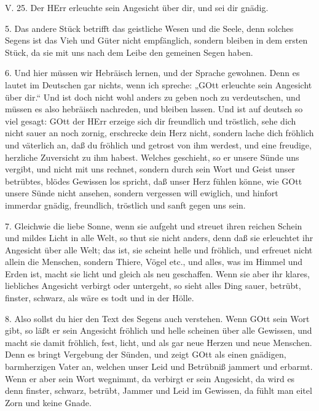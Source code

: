 \begin{schriftzitat}
V. 25. Der HErr erleuchte sein Angesicht über dir, und sei dir gnädig.
\end{schriftzitat}

5. Das andere Stück betrifft das geistliche Wesen und die Seele, denn solches Segens ist das Vieh und Güter nicht empfänglich, sondern bleiben in dem ersten Stück, da sie mit uns nach dem Leibe den gemeinen Segen haben.

6. Und hier müssen wir Hebräisch lernen, und der Sprache gewohnen. Denn es lautet im Deutschen gar nichts, wenn ich spreche: „GOtt erleuchte sein Angesicht über dir.“ Und ist doch nicht wohl anders zu geben noch zu verdeutschen, und müssen es also hebräisch nachreden, und bleiben lassen. Und ist auf deutsch so viel gesagt: GOtt der HErr erzeige sich dir freundlich und tröstlich, sehe dich nicht sauer an noch zornig, erschrecke dein Herz nicht, sondern lache dich fröhlich und väterlich an, daß du fröhlich und getrost von ihm werdest, und eine freudige, herzliche Zuversicht zu ihm habest. Welches geschieht, so er unsere Sünde uns vergibt, und nicht mit uns rechnet, sondern durch sein Wort und Geist unser betrübtes, blödes Gewissen los spricht, daß unser Herz fühlen könne, wie GOtt unsere Sünde nicht ansehen, sondern vergessen will ewiglich, und hinfort immerdar gnädig, freundlich, tröstlich und sanft gegen uns sein.

7. Gleichwie die liebe Sonne, wenn sie aufgeht und streuet ihren reichen Schein und mildes Licht in alle Welt, so thut sie nicht anders, denn daß sie erleuchtet ihr Angesicht über alle Welt; das ist, sie scheint helle und fröhlich, und erfreuet nicht allein die Menschen, sondern Thiere, Vögel etc., und alles, was im Himmel und Erden ist, macht sie licht und gleich als neu geschaffen. Wenn sie aber ihr klares, liebliches Angesicht verbirgt oder untergeht, so sieht alles Ding sauer, betrübt, finster, schwarz, als wäre es todt und in der Hölle.

8. Also sollst du hier den Text des Segens auch verstehen. Wenn GOtt sein Wort gibt, so läßt er sein Angesicht fröhlich und helle scheinen über alle Gewissen, und macht sie damit fröhlich, fest, licht, und als gar neue Herzen und neue Menschen. Denn es bringt Vergebung der Sünden, und zeigt GOtt als einen gnädigen, barmherzigen Vater an, welchen unser Leid und Betrübniß jammert und erbarmt. Wenn er aber sein Wort wegnimmt, da verbirgt er sein Angesicht, da wird es denn finster, schwarz, betrübt, Jammer und Leid im Gewissen, da fühlt man eitel Zorn und keine Gnade.

